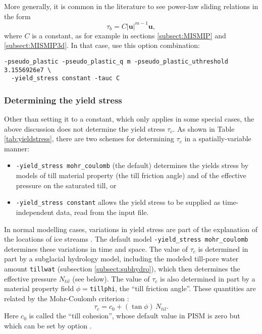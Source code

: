 More generally, it is common in the literature to see power-law sliding relations in the form
\begin{equation*}
  \tau_b = C |\mathbf{u}|^{m-1} \mathbf{u},
\end{equation*}
where $C$ is a constant, as for example in sections \ref{subsect:MISMIP} and \ref{subsect:MISMIP3d}.  In that case, use this option combination:
\begin{verbatim}
-pseudo_plastic -pseudo_plastic_q m -pseudo_plastic_uthreshold 3.1556926e7 \
  -yield_stress constant -tauc C
\end{verbatim}

\subsubsection*{Determining the yield stress}

Other than setting it to a constant, which only applies in some special cases, the above discussion does not determine the yield stress $\tau_c$.  As shown in Table \ref{tab:yieldstress}, there are two schemes for determining $\tau_c$ in a spatially-variable manner:
\begin{itemize}
\item \texttt{-yield_stress mohr_coulomb} (the default) determines the yields stress by models of till material property (the till friction angle) and of the effective pressure on the saturated till, or
\item \texttt{-yield_stress constant} allows the yield stress to be supplied as time-independent data, read from the input file.
\end{itemize}

In normal modelling cases, variations in yield stress are part of the explanation of the locations of ice streams \cite{SchoofStream}.  The default model \texttt{-yield_stress mohr_coulomb} determines these variations in time and space.  The value of $\tau_c$ is determined in part by a subglacial hydrology model, including the modeled till-pore water amount \texttt{tillwat} (subsection \ref{subsect:subhydro}), which then determines the effective pressure $N_{til}$ (see below).  The value of $\tau_c$ is also determined in part by a material property field $\phi=$\texttt{tillphi}, the ``till friction angle''.  These quantities are related by the Mohr-Coulomb criterion \cite{CuffeyPaterson}:
\begin{equation}
   \tau_c = c_{0} + (\tan\phi)\,N_{til}.  \label{eq:mohrcoulomb}
\end{equation}
Here $c_0$ is called the ``till cohesion'', whose default value in PISM is zero \cite[formula (2.4)]{SchoofStream} but which can be set by option .

